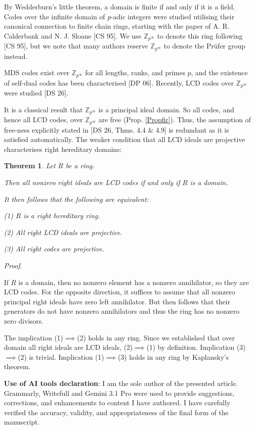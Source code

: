 \documentclass{article}
\theoremstyle{plain}
\newtheorem{Thm}[veta]{Theorem}
\theoremstyle{plain}
\theoremstyle{remark}
\theoremstyle{plain}
\newcommand{\p}{\mathbb{Z}_{p^\infty}}
\newenvironment{dukaz}{
  \par\medskip \noindent
  \textit{Proof}.
}{

\rightline{$\qedsymbol$}
}
\begin{document}
By  Wedderburn's little theorem, a domain is finite if and only if it is a field. Codes over the infinite domain of \textit{p}-adic integers were studied utilising their canonical connection to finite chain rings, starting with the paper of A. R. Calderbank and N. J. Sloane [CS 95]. We use $\p$ to denote this ring following [CS 95], but we note that many authors reserve $\p$ to denote the Prüfer group instead.  

MDS codes exist over $\p$ for all lengths, ranks, and primes $p$, and the existence of self-dual codes has been characterised  [DP 06]. Recently, LCD codes over $\p$ were studied [DS 26].

It is a classical result that $\p$ is a principal ideal domain. So all codes, and hence all LCD codes, over $\p$ are free (Prop. \ref{Propfir}). Thus, the assumption of free-ness explicitly stated in [DS 26, Thms. 4.4 \& 4.9] is redundant as it is satisfied automatically. The weaker condition that all LCD ideals are projective characterises right hereditary domains:
\begin{Thm}\label{ThmDomain}
    Let $R$ be a ring.
    
    Then all nonzero right ideals are LCD codes if and only if $R$ is a domain. 
    
    It then follows that the following are equivalent:

     (1) $R$ is a right hereditary ring.

    (2) All right LCD ideals are projective.

    (3) All right codes are projective.
\end{Thm}
\begin{dukaz}
 If $R$ is a domain, then no nonzero element has a nonzero annihilator, so they are LCD codes. For the opposite direction, it suffices to assume that all nonzero principal right ideals have zero left annihilator. But then follows that their generators do not have nonzero annihilators and thus the ring has no nonzero zero divisors. 

 The implication (1)$\implies$(2) holds in any ring. Since we established that over domain all right ideals are LCD ideals, (2)$\implies$(1) by definition. Implication (3)$\implies$(2) is trivial. Implication (1)$\implies$(3) holds in any ring by Kaplansky's theorem. 
\end{dukaz}

\medskip 


\textbf{Use of AI tools declaration}: I am the sole author of the presented article.  Grammarly, Writefull and Gemini 3.1 Pro were used to provide suggestions, corrections, and enhancements to content I have authored. I have carefully verified the accuracy, validity, and appropriateness of the final form of the manuscript.
\end{document}
